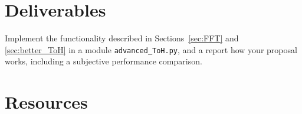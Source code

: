 \begin{comment}
\subsection{Subjective performance}

\begin{enumerate}
\item Using a recording tool such as
  \href{http://audacity.sourceforge.net}{Audacity} or
  \href{http://plugin.org.uk/timemachine/}{JACK Timemachine}, record
  the simulated transmission of a piece of audio and create a
  \texttt{.wav} file, when the audio has been transmitted using
  \texttt{temporal\_overlapped\_DWT\_coding.py} and
  \texttt{threshold.py}, using in both cases the same transmission
  bit-rate. Vary the quantization step size for controlling the
  bit-rate.
\item Determine which audio sounds better from a subjective point of
  view. Repeat this step the number of times you consider necessary.
\end{enumerate}
\end{comment}

\section{Deliverables}

Implement the functionality described in Sections~\ref{sec:FFT} and
\ref{sec:better_ToH} in a module \verb|advanced_ToH.py|, and a report
how your proposal works, including a subjective performance
comparison.

\section{Resources}



